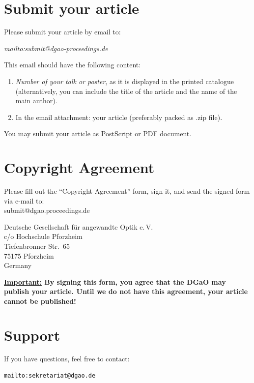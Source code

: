 \documentclass{DGaO-Proc}
\begin{document}
\section{Submit your article}

Please submit your article by email to:

\textit{mailto:submit@dgao-proceedings.de}

This email should have the following content:

\begin{enumerate}
\item\textit{Number of your talk or poster}, as it is displayed in the printed catalogue 
(alternatively, you can include the title of the article and the name of the main author).
\item In the email attachment: your article (preferably packed as .zip file).
\end{enumerate}

You may submit your article as PostScript or PDF document. 

\section{Copyright Agreement}

Please fill out the ``Copyright Agreement'' form, sign it, and send the signed form via e-mail to:\\
submit@dgao.proceedings.de

Deutsche Gesellschaft f\"ur angewandte Optik e.\,V.\\
c/o Hochschule Pforzheim\\
Tiefenbronner Str.\ 65\\
75175 Pforzheim\\
Germany

\textbf{\underline{Important:} By signing this form, you agree that the DGaO may publish 
your article. Until we do not have this agreement, your article cannot be published!}

\section{Support}

If you have questions, feel free to contact:

\texttt{mailto:sekretariat@dgao.de}

%
%
\end{document}
